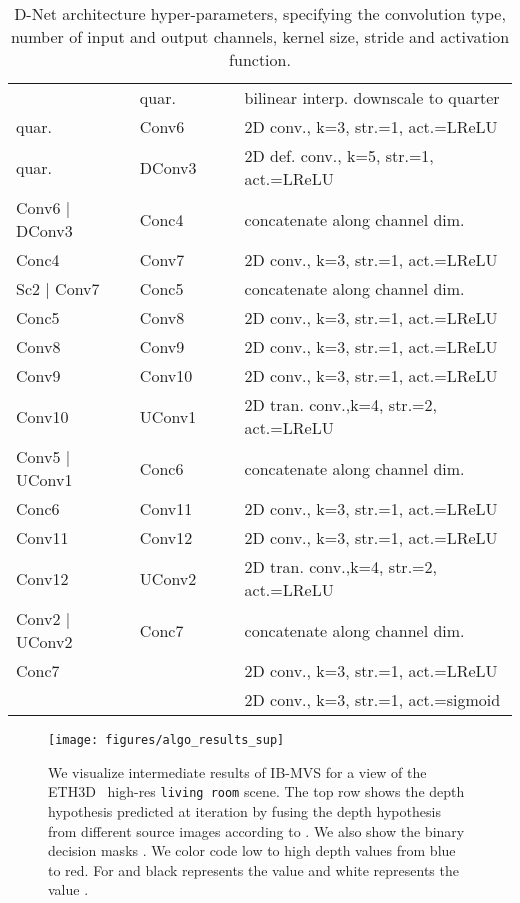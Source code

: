 \documentclass{bmvc2k}
\begin{document}
\begin{table}[t]
\begin{tabular}{@{}llccl@{}}
       &  quar. &  &  & bilinear interp. downscale to quarter \\
       quar. & Conv6 &  &  & 2D conv., k=3, str.=1, act.=LReLU
      \\
       quar. & DConv3 &  &  & 2D def. conv., k=5, str.=1, act.=LReLU \\
      Conv6 | DConv3 & Conc4 &  &  & concatenate along channel dim. \\
      Conc4 & Conv7 &  &  & 2D conv., k=3, str.=1, act.=LReLU \\
      Sc2 | Conv7 & Conc5 &  &  & concatenate along channel dim. \\
      Conc5 & Conv8 &  &  & 2D conv., k=3, str.=1, act.=LReLU \\
      Conv8 & Conv9 &  &  & 2D conv., k=3, str.=1, act.=LReLU \\
      Conv9 & Conv10 &  &  & 2D conv., k=3, str.=1, act.=LReLU \\
      Conv10 & UConv1 &  &  & 2D tran. conv.,k=4, str.=2, act.=LReLU  \\
      Conv5 | UConv1 & Conc6 &  &  & concatenate along channel dim. \\
      Conc6 & Conv11 &  &  & 2D conv., k=3, str.=1, act.=LReLU \\
      Conv11 & Conv12 &  &  & 2D conv., k=3, str.=1, act.=LReLU \\
      Conv12 & UConv2 &  &  & 2D tran. conv.,k=4, str.=2, act.=LReLU  \\
      Conv2 | UConv2 & Conc7 &  &  & concatenate along channel dim. \\
      Conc7 &  &  &  & 2D conv., k=3, str.=1, act.=LReLU \\
       &  &  &  & 2D conv., k=3, str.=1, act.=sigmoid \\
      \bottomrule
      \end{tabular}
  \caption{D-Net architecture hyper-parameters, specifying the convolution type, number of input and output channels, kernel size, stride and activation function.}
  \label{tab_network_arch_dnet}
  \end{table}

\begin{figure}[t]
\centering
\texttt{[image: figures/algo\_results\_sup]}
\caption{We visualize intermediate results of IB-MVS for a view of the ETH3D~\cite{eth3d} high-res \texttt{living room} scene.
The top row shows the depth hypothesis  predicted at iteration  by fusing the depth hypothesis  from different source images according to . We also show the binary decision masks . We color code low to high depth values from blue to red. For  and  black represents the value  and white represents the value . 
}
\label{fig_algo_results_sup}
\end{figure}
\end{document}
